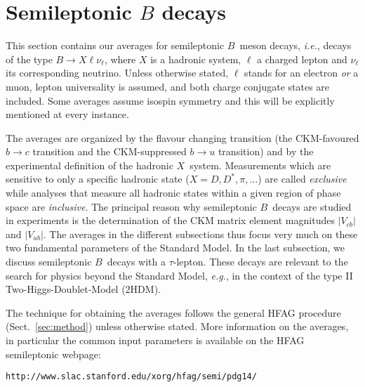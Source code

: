 

\section{Semileptonic $B$ decays}
\label{sec:slbdecays}

This section contains our averages for semileptonic $B$~meson decays,
{\it i.e.}, decays of the type $B\to X\ell\nu_\ell$, where $X$ is a
hadronic system, $\ell$ a charged lepton and $\nu_\ell$ its corresponding
neutrino. Unless otherwise stated, $\ell$ stands for an electron
\emph{or} a muon, lepton universality is assumed, and both charge
conjugate states are included. Some averages assume isospin symmetry
and this will be explicitly mentioned at every instance.

The averages are organized by the flavour changing transition
(the CKM-favoured $b\to c$ transition and the CKM-suppressed $b\to u$
transition) and by the experimental definition of the hadronic
$X$~system. Measurements which are sensitive to only a specific
hadronic state ($X=D,D^*,\pi,\dots$) are called \emph{exclusive} while
analyses that measure all hadronic states within a given region of
phase space are \emph{inclusive}. The principal reason why semileptonic
$B$~decays are studied in experiments is the determination of the CKM
matrix element magnitudes $|V_{cb}|$ and $|V_{ub}|$. The averages in
the different subsections thus focus very much on these two
fundamental parameters of the Standard Model. In the last subsection,
we discuss semileptonic $B$~decays with a $\tau$-lepton. These
decays are relevant to the search for physics beyond the Standard
Model, {\it e.g.}, in the context of the type II
Two-Higgs-Doublet-Model (2HDM).

The technique for obtaining the averages follows the general HFAG
procedure (Sect.~\ref{sec:method}) unless otherwise stated. More
information on the averages, in particular the common input parameters
is available on the HFAG semileptonic webpage:

\centerline{\tt http://www.slac.stanford.edu/xorg/hfag/semi/pdg14/}




